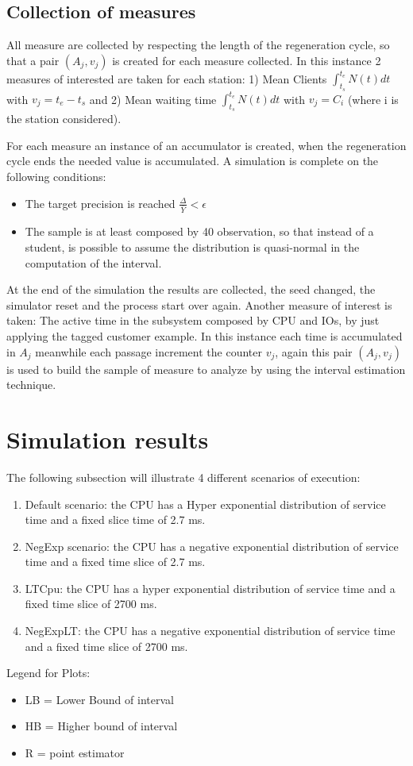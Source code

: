 \documentclass[12pt,a4paper]{article}
\begin{document}
\subsection{Collection of measures}

All measure are collected by respecting the length of the regeneration cycle, so that a pair $(A_j,v_j)$ is created for each measure collected. In this instance 2 measures of interested are taken for each station: 1) Mean Clients $\int_{t_s}^{t_e}N(t)dt$ with $v_j=t_e-t_s$ and 2) Mean waiting time $\int_{t_s}^{t_e}N(t)dt$ with $v_j=C_i$ (where i is the station considered).

For each measure an instance of an accumulator is created, when the regeneration cycle ends the needed value is accumulated. A simulation is complete on the following conditions:
\begin{itemize}
    \item The target precision is reached $\frac{\Delta}{\bar{Y}}<\epsilon$
    \item The sample is at least composed by 40 observation, so that instead of a student, is possible to assume the distribution is quasi-normal in the computation of the interval.
\end{itemize}
At the end of the simulation the results are collected, the seed changed, the simulator reset and the process start over again.
Another measure of interest is taken: The active time in the subsystem composed by CPU and IOs, by just applying the tagged customer example. In this instance each time is accumulated in $A_j$ meanwhile each passage increment the counter $v_j$, again this pair $(A_j,v_j)$ is used to build the sample of measure to analyze by using the interval estimation technique.
\section{Simulation results}

The following subsection will illustrate 4 different scenarios of execution:
\begin{enumerate}
    \item Default scenario: the CPU has a Hyper exponential distribution of service time and a fixed slice time of 2.7 ms.
    \item NegExp scenario: the CPU has a negative exponential distribution of service time and a fixed time slice of 2.7 ms.
    \item LTCpu: the CPU has a hyper exponential distribution of service time and a fixed time slice of 2700 ms.
    \item NegExpLT: the CPU has a negative exponential distribution of service time and a fixed time slice of 2700 ms.
\end{enumerate}
Legend for Plots:
\begin{itemize}
    \item LB = Lower Bound of interval 
    \item HB = Higher bound of interval 
    \item R = point estimator
\end{itemize}
\end{document}
